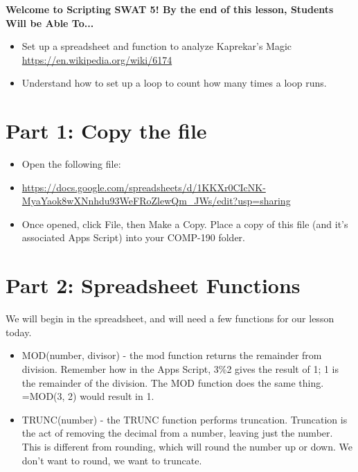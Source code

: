 \documentclass{article}
\newcommand{\AName}{Scripting SWAT 5}
\begin{document}
\textbf{Welcome to \AName!  By the end of this lesson, Students Will be Able To...}
\begin{itemize}
    \item Set up a spreadsheet and function to analyze Kaprekar's Magic \url{https://en.wikipedia.org/wiki/6174}
    \item Understand how to set up a loop to count how many times a loop runs.
\end{itemize}


\section*{Part 1: Copy the file}
\begin{itemize}
    \item Open the following file:
    \item \url{https://docs.google.com/spreadsheets/d/1KKXr0CIcNK-MyaYaok8wXNnhdu93WeFRoZlewQm_JWs/edit?usp=sharing}
    \item Once opened, click File, then Make a Copy.  Place a copy of this file (and it's associated Apps Script) into your COMP-190 folder.
\end{itemize}

\section*{Part 2: Spreadsheet Functions}
We will begin in the spreadsheet, and will need a few functions for our lesson today.
\begin{itemize}
    \item MOD(number, divisor) - the mod function returns the remainder from division.  Remember how in the Apps Script, 3\%2 gives the result of 1; 1 is the remainder of the division.  The MOD function does the same thing.  =MOD(3, 2) would result in 1.
    \item TRUNC(number) - the TRUNC function performs truncation.  Truncation is the act of removing the decimal from a number, leaving just the number.  This is different from rounding, which will round the number up or down.  We don't want to round, we want to truncate. 
\end{itemize}
\end{document}
